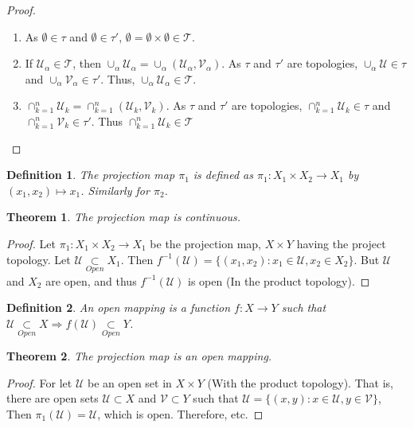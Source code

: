 \documentclass[crop=false,class=book]{standalone}
\theoremstyle{mystyle}
\newtheorem{theorem}{Theorem}[section]
\newtheorem{definition}{Definition}[section]
\begin{document}
\begin{proof}
\
\begin{enumerate}
\item As $\emptyset \in \tau$ and $\emptyset\in \tau'$, $\emptyset =\emptyset\times \emptyset \in \mathscr{T}$.
\item If $\mathscr{U}_{\alpha}\in \mathscr{T}$, then $\cup_{\alpha} \mathscr{U}_{\alpha} = \cup_{\alpha} (\mathcal{U}_{\alpha},\mathcal{V}_{\alpha})$. As $\tau$ and $\tau'$ are topologies, $\cup_{\alpha} \mathcal{U} \in \tau$ and $\cup_{\alpha}\mathcal{V}_{\alpha} \in \tau'$. Thus, $\cup_{\alpha}\mathscr{U}_{\alpha} \in \mathscr{T}$.
\item $\cap_{k=1}^{n} \mathscr{U}_{k} = \cap_{k=1}^{n} (\mathcal{U}_k,\mathcal{V}_k)$. As $\tau$ and $\tau'$ are topologies, $\cap_{k=1}^{n}\mathcal{U}_k \in \tau$ and $\cap_{k=1}^{n}\mathcal{V}_{k} \in \tau'$. Thus $\cap_{k=1}^{n} \mathscr{U}_k \in \mathscr{T}$
\end{enumerate}
\end{proof}
\begin{definition}
The projection map $\pi_1$ is defined as $\pi_1:X_1\times X_2\rightarrow X_1$ by $(x_1,x_2)\mapsto x_1$. Similarly for $\pi_2$.
\end{definition}
\begin{theorem}
The projection map is continuous.
\end{theorem}
\begin{proof}
Let $\pi_1:X_1\times X_2\rightarrow X_1$ be the projection map, $X\times Y$ having the project topology. Let $\mathcal{U}\underset{Open}\subset X_1$. Then $f^{-1}(\mathcal{U}) = \{(x_1,x_2):x_1\in \mathcal{U}, x_2\in X_2\}$. But $\mathcal{U}$ and $X_2$ are open, and thus $f^{-1}(\mathcal{U})$ is open (In the product topology).
\end{proof}
\begin{definition}
An open mapping is a function $f:X\rightarrow Y$ such that $\mathcal{U}\underset{Open}\subset X\Rightarrow f(\mathcal{U}) \underset{Open}\subset Y$.
\end{definition}
\begin{theorem}
The projection map is an open mapping.
\end{theorem}
\begin{proof}
For let $\mathscr{U}$ be an open set in $X\times Y$ (With the product topology). That is, there are open sets $\mathcal{U}\subset X$ and $\mathcal{V}\subset Y$ such that $\mathscr{U}= \{(x,y):x\in \mathcal{U},y\in \mathcal{V}\}$, Then $\pi_1(\mathscr{U}) =\mathcal{U}$, which is open. Therefore, etc.
\end{proof}
\end{document}
